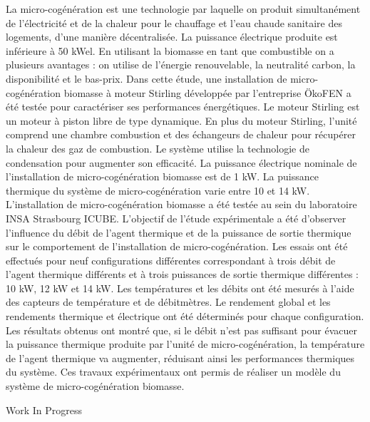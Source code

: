 {\normalsize
La micro-cogénération est une technologie par laquelle on produit simultanément de l'électricité et de la chaleur pour le chauffage et l'eau chaude sanitaire des logements, d'une manière décentralisée. La puissance électrique produite est inférieure à 50 kWel. En utilisant la biomasse en tant que combustible on a plusieurs avantages : on utilise de l'énergie renouvelable, la neutralité carbon, la disponibilité et le bas-prix. Dans cette étude, une installation de micro-cogénération biomasse à moteur Stirling développée par l'entreprise ÖkoFEN a été testée pour caractériser ses performances énergétiques. Le moteur Stirling est un moteur à piston libre de type dynamique. En plus du moteur Stirling, l'unité comprend une chambre combustion et des échangeurs de chaleur pour récupérer la chaleur des gaz de combustion. Le système utilise la technologie de condensation pour augmenter son efficacité. La puissance électrique nominale de l'installation de micro-cogénération biomasse est de 1 kW. La puissance thermique du système de micro-cogénération varie entre 10 et 14 kW. L'installation de micro-cogénération biomasse a été testée au sein du laboratoire INSA Strasbourg ICUBE. L'objectif de l'étude expérimentale a été d'observer  l'influence du débit de l'agent thermique et de la puissance de sortie thermique sur le comportement  de l'installation de micro-cogénération. Les essais ont été effectués pour neuf configurations différentes correspondant à trois débit de l'agent thermique différents et à trois puissances de sortie thermique différentes : 10 kW, 12 kW et 14 kW. Les températures et les débits ont été mesurés à l'aide des capteurs de température et de débitmètres. Le rendement global et les rendements thermique et électrique ont été déterminés pour chaque configuration. Les résultats obtenus ont montré que, si le débit n'est pas suffisant pour évacuer la puissance thermique produite par l'unité de micro-cogénération, la température de l'agent thermique va augmenter, réduisant ainsi les performances thermiques du système. Ces travaux expérimentaux ont permis de réaliser un modèle du système de micro-cogénération biomasse.

 \vfill Work In Progress

}
 
